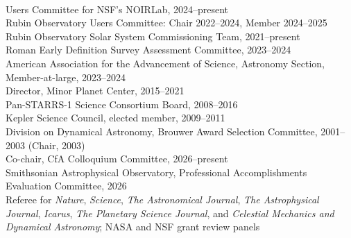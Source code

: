 \documentclass[11pt,letterpaper]{article}
\newcommand{\sect}[1]{\vspace{0.14in}\noindent{\bf #1}\vspace{0.06in}\\}
\begin{document}
\sect{Selected Service}
\noindent
{\small
Users Committee for NSF's NOIRLab, 2024--present\\
Rubin Observatory Users Committee: Chair 2022--2024, Member 2024--2025\\
Rubin Observatory Solar System Commissioning Team, 2021--present\\
Roman Early Definition Survey Assessment Committee, 2023--2024\\
American Association for the Advancement of Science, Astronomy Section,
Member-at-large, 2023--2024\\
Director, Minor Planet Center, 2015--2021\\
Pan-STARRS-1 Science Consortium Board, 2008--2016\\
Kepler Science Council, elected member, 2009--2011\\
Division on Dynamical Astronomy, Brouwer Award Selection Committee, 2001--2003
(Chair, 2003)\\
Co-chair, CfA Colloquium Committee, 2026--present\\
Smithsonian Astrophysical Observatory, Professional Accomplishments Evaluation
Committee, 2026\\
Referee for {\it Nature}, {\it Science}, {\it The Astronomical Journal}, {\it
The Astrophysical Journal}, {\it Icarus}, {\it The Planetary Science Journal},
and {\it Celestial Mechanics and Dynamical Astronomy}; NASA and NSF grant review
panels
}
\end{document}

